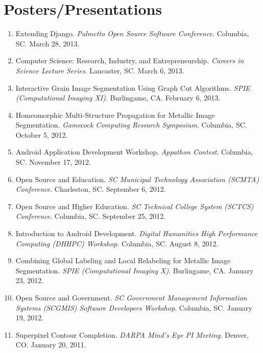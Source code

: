 \documentclass[10pt]{article}
\begin{document}
\renewcommand\refname{Publications}



\section{Posters/Presentations}
\begin{enumerate}
\renewcommand{\labelenumi}{[P\arabic{enumi}] }
\item Extending Django.  \emph{Palmetto Open Source Software
    Conference}.  Columbia, SC.  March 28, 2013.
\item Computer Science: Research, Industry, and Entrepreneurship.
  \emph{Careers in Science Lecture Series}.  Lancaster, SC.  March 6,
  2013.
\item Interactive Grain Image Segmentation Using Graph Cut Algorithms.
  \emph{SPIE (Computational Imaging XI)}.  Burlingame, CA.  February
  6, 2013.
\item Homeomorphic Multi-Structure Propagation for Metallic Image
  Segmentation.  \emph{Gamecock Computing Research Symposium}.
  Columbia, SC.  October 5, 2012.
\item Android Application Development Workshop.  \emph{Appathon
    Contest}.  Columbia, SC.  November 17, 2012.
\item Open Source and Education. \emph{SC Municipal Technology
    Association (SCMTA) Conference}. Charleston, SC.  September 6,
  2012.
\item Open Source and Higher Education.  \emph{SC Technical College
    System (SCTCS) Conference}.  Columbia, SC.  September 25, 2012.
\item Introduction to Android Development.  \emph{Digital Humanities
    High Performance Computing (DHHPC) Workshop}.  Columbia, SC.
  August 8, 2012.
\item Combining Global Labeling and Local Relabeling for Metallic
  Image Segmentation.  \emph{SPIE (Computational Imaging X)}.
  Burlingame, CA.  January 23, 2012.
\item Open Source and Government.  \emph{SC Government Management
    Information Systems (SCGMIS) Software Developers Workshop}.
  Columbia, SC.  January 19, 2012.
\item Superpixel Contour Completion.  \emph{DARPA Mind's Eye PI
    Meeting}.  Denver, CO.  January 20, 2011.
\end{enumerate}
\end{document}
